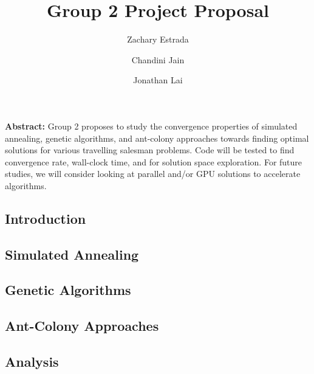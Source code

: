 \documentclass[12pt,onecolumn,notitlepage]{article}
\title{Group 2 Project Proposal}
\author{Zachary Estrada \and Chandini Jain \and Jonathan Lai}
\begin{document}
\maketitle


\textbf{Abstract:} Group 2 proposes to study the convergence
properties of simulated annealing, genetic algorithms, and ant-colony approaches towards
finding optimal solutions for various travelling salesman problems.  Code will be tested
to find convergence rate, wall-clock time, and for solution space exploration.  For future studies,
we will consider looking at parallel and/or GPU solutions to accelerate algorithms.
\subsection{Introduction}
\subsection{Simulated Annealing}
\subsection{Genetic Algorithms}
\subsection{Ant-Colony Approaches}
\subsection{Analysis}

\end{document}
